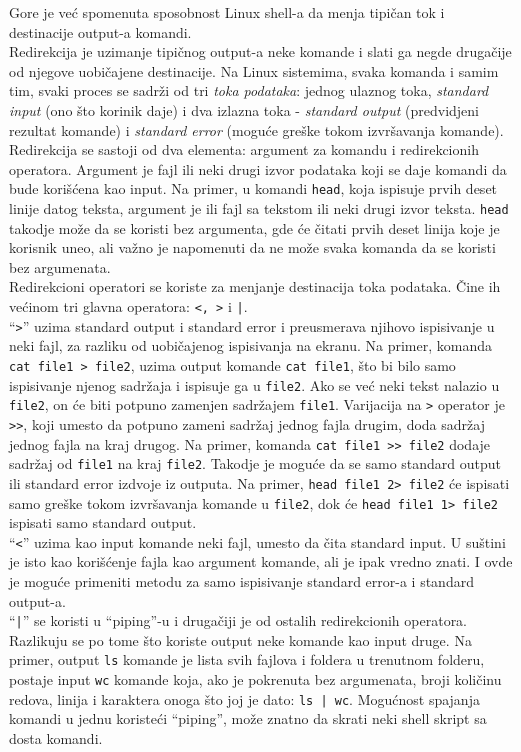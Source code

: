 Gore je već spomenuta sposobnost Linux shell-a da menja tipičan tok i destinacije output-a komandi.\\
Redirekcija je uzimanje tipičnog output-a neke komande i slati ga negde drugačije od njegove uobičajene destinacije. Na Linux sistemima, svaka komanda i samim tim, svaki proces se sadrži od tri \textit{toka podataka}: jednog ulaznog toka, \textit{standard input} (ono što korinik daje) i dva izlazna toka - \textit{standard output} (predvidjeni rezultat komande) i \textit{standard error} (moguće greške tokom izvršavanja komande).\\
Redirekcija se sastoji od dva elementa: argument za komandu i redirekcionih operatora. Argument je fajl ili neki drugi izvor podataka koji se daje komandi da bude korišćena kao input. Na primer, u komandi \texttt{head}, koja ispisuje prvih deset linije datog teksta, argument je ili fajl sa tekstom ili neki drugi izvor teksta. \texttt{head} takodje može da se koristi bez argumenta, gde će čitati prvih deset linija koje je korisnik uneo, ali važno je napomenuti da ne može svaka komanda da se koristi bez argumenata.
\\
Redirekcioni operatori se koriste za menjanje destinacija toka podataka. Čine ih većinom tri glavna operatora: \texttt{<, >} i \texttt{|}.\\
``\texttt{>}'' uzima standard output i standard error i preusmerava njihovo ispisivanje u neki fajl, za razliku od uobičajenog ispisivanja na ekranu. Na primer, komanda \texttt{cat file1 > file2}, uzima output komande \texttt{cat file1}, što bi bilo samo ispisivanje njenog sadržaja i ispisuje ga u \texttt{file2}. Ako se već neki tekst nalazio u \texttt{file2}, on će biti potpuno zamenjen sadržajem \texttt{file1}. Varijacija na \texttt{>} operator je \texttt{>>}, koji umesto da potpuno zameni sadržaj jednog fajla drugim, doda sadržaj jednog fajla na kraj drugog. Na primer, komanda \texttt{cat file1 >> file2} dodaje sadržaj od \texttt{file1} na kraj \texttt{file2}. Takodje je moguće da se samo standard output ili standard error izdvoje iz outputa. Na primer, \texttt{head file1 2> file2} će ispisati samo greške tokom izvršavanja komande u \texttt{file2}, dok će \texttt{head file1 1> file2} ispisati samo standard output.\\
``\texttt{<}'' uzima kao input komande neki fajl, umesto da čita standard input. U suštini je isto kao korišćenje fajla kao argument komande, ali je ipak vredno znati. I ovde je moguće primeniti metodu za samo ispisivanje standard error-a i standard output-a.\\
``\texttt{|}'' se koristi u ``piping''-u i  drugačiji je od ostalih redirekcionih operatora. Razlikuju se po tome što koriste 	output neke komande kao input druge. Na primer, output \texttt{ls} komande je lista svih fajlova i foldera u trenutnom folderu, postaje input \texttt{wc} komande koja, ako je pokrenuta bez argumenata, broji količinu redova, linija i karaktera onoga što joj je dato: 
\texttt{ls | wc}. Mogućnost spajanja komandi u jednu koristeći ``piping'', može znatno da skrati neki shell skript sa dosta komandi.
